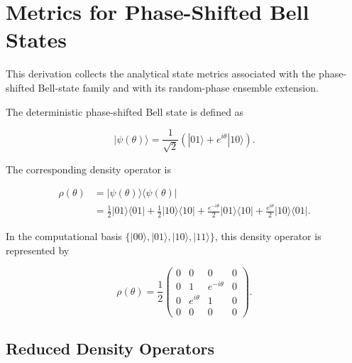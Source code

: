 
\section{Metrics for Phase-Shifted Bell States}

This derivation collects the analytical state metrics associated with the phase-shifted Bell-state family and with its random-phase ensemble extension.

\medskip

The deterministic phase-shifted Bell state is defined as

\begin{equation}
|\psi(\theta)\rangle
=
\frac{1}{\sqrt{2}}
\left(
|01\rangle + e^{i\theta}|10\rangle
\right).
\label{eq:d5_phase_shifted_bell_state}
\end{equation}

The corresponding density operator is

\begin{align}
\rho(\theta)
&=
|\psi(\theta)\rangle\langle\psi(\theta)|
\nonumber
\\
&=
\frac{1}{2}|01\rangle\langle 01|
+
\frac{1}{2}|10\rangle\langle 10|
+
\frac{e^{-i\theta}}{2}|01\rangle\langle 10|
+
\frac{e^{i\theta}}{2}|10\rangle\langle 01|.
\label{eq:d5_phase_shifted_density_operator}
\end{align}

In the computational basis \( \{|00\rangle, |01\rangle, |10\rangle, |11\rangle\} \), this density operator is represented by

\begin{equation}
\rho(\theta)
=
\frac{1}{2}
\begin{pmatrix}
0 & 0 & 0 & 0 \\
0 & 1 & e^{-i\theta} & 0 \\
0 & e^{i\theta} & 1 & 0 \\
0 & 0 & 0 & 0
\end{pmatrix}.
\label{eq:d5_phase_shifted_density_matrix}
\end{equation}


\subsection{Reduced Density Operators}

